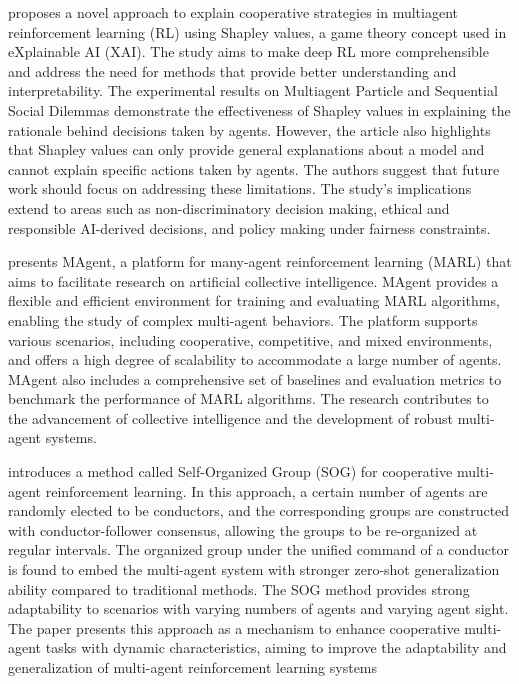 \documentclass{ecai}
\begin{document}
\citep{Heuillet2022} proposes a novel approach to explain cooperative strategies in multiagent reinforcement learning (RL) using Shapley values, a game theory concept used in eXplainable AI (XAI). The study aims to make deep RL more comprehensible and address the need for methods that provide better understanding and interpretability. The experimental results on Multiagent Particle and Sequential Social Dilemmas demonstrate the effectiveness of Shapley values in explaining the rationale behind decisions taken by agents. However, the article also highlights that Shapley values can only provide general explanations about a model and cannot explain specific actions taken by agents. The authors suggest that future work should focus on addressing these limitations. The study's implications extend to areas such as non-discriminatory decision making, ethical and responsible AI-derived decisions, and policy making under fairness constraints.

\citep{Zheng2018} presents MAgent, a platform for many-agent reinforcement learning (MARL) that aims to facilitate research on artificial collective intelligence. MAgent provides a flexible and efficient environment for training and evaluating MARL algorithms, enabling the study of complex multi-agent behaviors. The platform supports various scenarios, including cooperative, competitive, and mixed environments, and offers a high degree of scalability to accommodate a large number of agents. MAgent also includes a comprehensive set of baselines and evaluation metrics to benchmark the performance of MARL algorithms. The research contributes to the advancement of collective intelligence and the development of robust multi-agent systems.

\citep{Shao2022} introduces a method called Self-Organized Group (SOG) for cooperative multi-agent reinforcement learning. In this approach, a certain number of agents are randomly elected to be conductors, and the corresponding groups are constructed with conductor-follower consensus, allowing the groups to be re-organized at regular intervals. The organized group under the unified command of a conductor is found to embed the multi-agent system with stronger zero-shot generalization ability compared to traditional methods. The SOG method provides strong adaptability to scenarios with varying numbers of agents and varying agent sight. The paper presents this approach as a mechanism to enhance cooperative multi-agent tasks with dynamic characteristics, aiming to improve the adaptability and generalization of multi-agent reinforcement learning systems
\end{document}
